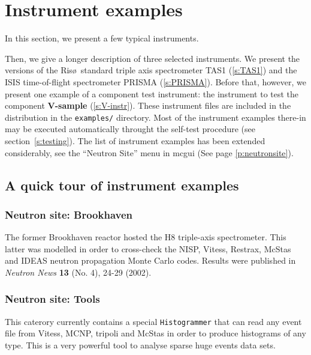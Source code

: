 
\chapter{Instrument examples}
\label{s:instrument}

In this section, we present a few typical instruments.

Then, we give a longer description of three selected
instruments. We present the \MCS versions of
the Ris\o\ standard triple axis spectrometer TAS1 (\ref{s:TAS1})
and the ISIS time-of-flight spectrometer PRISMA (\ref{s:PRISMA}).
Before that, however, we present one example of a component
test instrument: the instrument to test the component
{\bf V-sample} (\ref{s:V-instr}).
%
These instrument files are included in the \MCS distribution
in the \verb+examples/+ directory.
Most of the instrument examples there-in may be executed automatically throught the \MCS self-test procedure (see section~\ref{s:testing}).
The list of instrument examples has been extended considerably, see
the ``Neutron Site'' menu in mcgui (See page \ref{p:neutronsite}).

\section{A quick tour of instrument examples}
\label{s:quick-tour-instr}

\subsection{Neutron site: Brookhaven}

The former Brookhaven reactor hosted the H8 triple-axis spectrometer. This latter was modelled in order to cross-check the NISP, Vitess, Restrax, McStas and IDEAS neutron propagation Monte Carlo codes. Results were published in {\it Neutron News} {\bf 13} (No. 4), 24-29 (2002).

\subsection{Neutron site: Tools}

This caterory currently contains a special \verb+Histogrammer+ that can read any event file from Vitess, MCNP, tripoli and McStas in order to produce histograms of any type. This is a very powerful tool to analyse sparse huge events data sets.

